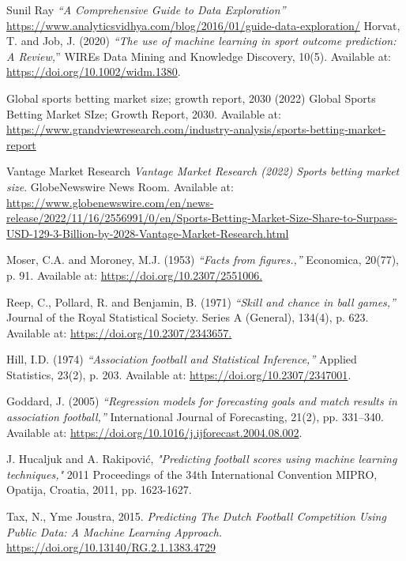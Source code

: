 \documentclass[8pt]{article}
\begin{document}
\begin{thebibliography}{1}

    Sunil Ray
    \newblock \textit{``A Comprehensive Guide to Data Exploration''}
    \url{https://www.analyticsvidhya.com/blog/2016/01/guide-data-exploration/}
Horvat, T. and Job, J. (2020) \textit{``The use of machine learning in sport outcome prediction: A Review,}'' WIREs Data Mining and Knowledge Discovery, 10(5). Available at: \url{https://doi.org/10.1002/widm.1380}. 

Global sports betting market size; growth report, 2030 (2022) Global Sports Betting Market SIze; Growth Report, 2030. Available at: \url{https://www.grandviewresearch.com/industry-analysis/sports-betting-market-report}

Vantage Market Research {\em Vantage Market Research (2022) Sports betting market size}. GlobeNewswire News Room. Available at: \url{https://www.globenewswire.com/en/news-release/2022/11/16/2556991/0/en/Sports-Betting-Market-Size-Share-to-Surpass-USD-129-3-Billion-by-2028-Vantage-Market-Research.html}

Moser, C.A. and Moroney, M.J. (1953) {\em “Facts from figures.,”} Economica, 20(77), p. 91. Available at: \url{https://doi.org/10.2307/2551006.}

Reep, C., Pollard, R. and Benjamin, B. (1971) {\em“Skill and chance in ball games,”} Journal of the Royal Statistical Society. Series A (General), 134(4), p. 623. Available at: \url{https://doi.org/10.2307/2343657.} 

Hill, I.D. (1974) {\em“Association football and Statistical Inference,”} Applied Statistics, 23(2), p. 203. Available at: \url{https://doi.org/10.2307/2347001}.

Goddard, J. (2005) \textit{“Regression models for forecasting goals and match results in association football,”} International Journal of Forecasting, 21(2), pp. 331–340. Available at: \url{https://doi.org/10.1016/j.ijforecast.2004.08.002}. 

J. Hucaljuk and A. Rakipović, \textit{"Predicting football scores using machine learning techniques,"} 2011 Proceedings of the 34th International Convention MIPRO, Opatija, Croatia, 2011, pp. 1623-1627.

    
    Tax, N., Yme Joustra, 2015. \textit{Predicting The Dutch Football Competition Using Public Data: A Machine Learning Approach. } \url{https://doi.org/10.13140/RG.2.1.1383.4729}


\end{thebibliography}
\end{document}
